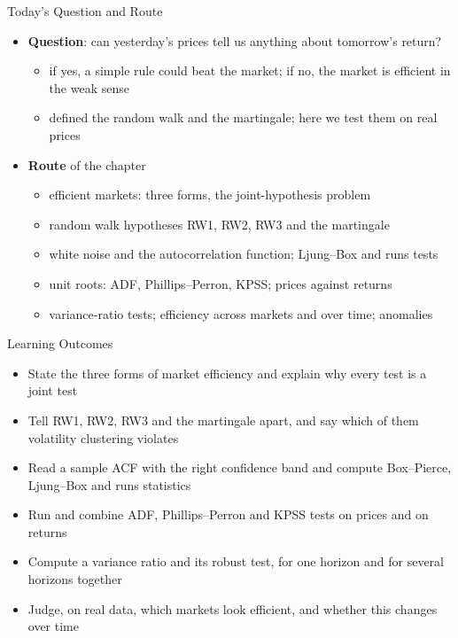 \begin{frame}{Today's Question and Route}
\itemsize{\small}
\begin{itemize}
    \item \textbf{Question}: can yesterday's prices tell us anything about tomorrow's return?
    \begin{itemize}
        \item if yes, a simple rule could beat the market; if no, the market is efficient in the weak sense
        \item {} defined the random walk and the martingale; here we test them on real prices
    \end{itemize}
    \item \textbf{Route} of the chapter
    \begin{itemize}
        \item efficient markets: three forms, the joint-hypothesis problem
        \item random walk hypotheses RW1, RW2, RW3 and the martingale
        \item white noise and the autocorrelation function; Ljung--Box and runs tests
        \item unit roots: ADF, Phillips--Perron, KPSS; prices against returns
        \item variance-ratio tests; efficiency across markets and over time; anomalies
    \end{itemize}
\end{itemize}
\end{frame}

\begin{frame}{Learning Outcomes}
\itemsize{\small}
\begin{itemize}
    \item State the three forms of market efficiency and explain why every test is a joint test
    \item Tell RW1, RW2, RW3 and the martingale apart, and say which of them volatility clustering violates
    \item Read a sample ACF with the right confidence band and compute Box--Pierce, Ljung--Box and runs statistics
    \item Run and combine ADF, Phillips--Perron and KPSS tests on prices and on returns
    \item Compute a variance ratio and its robust test, for one horizon and for several horizons together
    \item Judge, on real data, which markets look efficient, and whether this changes over time
\end{itemize}
\end{frame}

